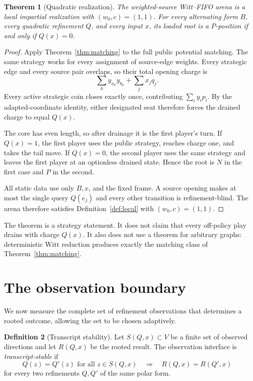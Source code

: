 \documentclass[11pt]{article}
\newtheorem{theorem}{Theorem}[section]
\theoremstyle{definition}
\newtheorem{definition}[theorem]{Definition}
\theoremstyle{remark}
\begin{document}
\begin{theorem}[Quadratic realization]\label{thm:realization}
The weighted-source Witt--FIFO arena is a local impartial realization with
$(w_0,c)=(1,1)$.  For every alternating form $B$, every quadratic refinement
$Q$, and every input $x$, its loaded root is a $P$-position if and only if
$Q(x)=0$.
\end{theorem}

\begin{proof}
Apply Theorem~\ref{thm:matching} to the full public potential matching.  The
same strategy works for every assignment of source-edge weights.  Every
strategic edge and every source pair overlaps, so their total opening charge
is
\[
  \sum_hy_{a_h}y_{b_h}+\sum_jx_jq_j.
\]
Every active strategic coin closes exactly once, contributing
$\sum_i y_ip_i$.  By the adapted-coordinate identity, either designated
seat therefore forces the drained charge to equal $Q(x)$.

The core has even length, so after drainage it is the first player's turn.
If $Q(x)=1$, the first player uses the public strategy, reaches charge one,
and takes the tail move.  If $Q(x)=0$, the second player uses the same strategy
and leaves the first player at an optionless drained state.  Hence the root is
$N$ in the first case and $P$ in the second.

All static data use only $B,x$, and the fixed frame.  A source opening makes
at most the single query $Q(e_j)$ and every other transition is
refinement-blind.  The arena therefore satisfies Definition~\ref{def:local}
with $(w_0,c)=(1,1)$.
\end{proof}

The theorem is a strategy statement.  It does not claim that every off-policy
play drains with charge $Q(x)$.  It also does not use a theorem for arbitrary
graphs: deterministic Witt reduction produces exactly the matching class of
Theorem~\ref{thm:matching}.

\section{The observation boundary}\label{sec:observation}

We now measure the complete set of refinement observations that determines a
rooted outcome, allowing the set to be chosen adaptively.

\begin{definition}[Transcript stability]
Let $S(Q,x)\subset V$ be a finite set of observed directions and let
$R(Q,x)$ be the rooted result.  The observation interface is
\emph{transcript-stable} if
\[
 Q(z)=Q'(z)\text{ for all }z\in S(Q,x)
 \quad\Longrightarrow\quad
 R(Q,x)=R(Q',x)
\]
for every two refinements $Q,Q'$ of the same polar form.
\end{definition}
\end{document}
